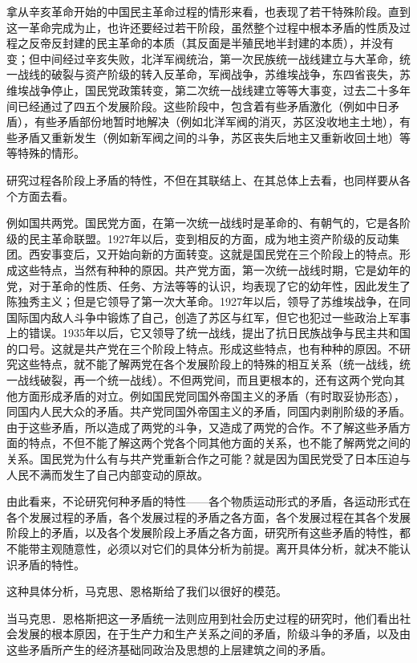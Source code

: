 \documentclass[UTF8, 12pt, a4paper]{ctexrep}
\begin{document}
拿从辛亥革命开始的中国民主革命过程的情形来看，也表现了若干特殊阶段。直到这一革命完成为止，也许还要经过若干阶段，虽然整个过程中根本矛盾的性质及过程之反帝反封建的民主革命的本质（其反面是半殖民地半封建的本质），并没有变；但中间经过辛亥失败，北洋军阀统治，第一次民族统一战线建立与大革命，统一战线的破裂与资产阶级的转入反革命，军阀战争，苏维埃战争，东四省丧失，苏维埃战争停止，国民党政策转变，第二次统一战线建立等等大事变，过去二十多年间已经通过了四五个发展阶段。这些阶段中，包含着有些矛盾激化（例如中日矛盾），有些矛盾部份地暂时地解决（例如北洋军阀的消灭，苏区没收地主土地），有些矛盾又重新发生（例如新军阀之间的斗争，苏区丧失后地主又重新收回土地）等等特殊的情形。

研究过程各阶段上矛盾的特性，不但在其联结上、在其总体上去看，也同样要从各个方面去看。

例如国共两党。国民党方面，在第一次统一战线时是革命的、有朝气的，它是各阶级的民主革命联盟。1927年以后，变到相反的方面，成为地主资产阶级的反动集团。西安事变后，又开始向新的方面转变。这就是国民党在三个阶段上的特点。形成这些特点，当然有种种的原因。共产党方面，第一次统一战线时期，它是幼年的党，对于革命的性质、任务、方法等等的认识，均表现了它的幼年性，因此发生了陈独秀主义；但是它领导了第一次大革命。1927年以后，领导了苏维埃战争，在同国际国内敌人斗争中锻炼了自己，创造了苏区与红军，但它也犯过一些政治上军事上的错误。1935年以后，它又领导了统一战线，提出了抗日民族战争与民主共和国的口号。这就是共产党在三个阶段上特点。形成这些特点，也有种种的原因。不研究这些特点，就不能了解两党在各个发展阶段上的特殊的相互关系（统一战线，统一战线破裂，再一个统一战线）。不但两党间，而且更根本的，还有这两个党向其他方面形成矛盾的对立。例如国民党同国外帝国主义的矛盾（有时取妥协形态），同国内人民大众的矛盾。共产党同国外帝国主义的矛盾，同国内剥削阶级的矛盾。由于这些矛盾，所以造成了两党的斗争，又造成了两党的合作。不了解这些矛盾方面的特点，不但不能了解这两个党各个同其他方面的关系，也不能了解两党之间的关系。国民党为什么有与共产党重新合作之可能？就是因为国民党受了日本压迫与人民不满而发生了自己内部变动的原故。

由此看来，不论研究何种矛盾的特性——各个物质运动形式的矛盾，各运动形式在各个发展过程的矛盾，各个发展过程的矛盾之各方面，各个发展过程在其各个发展阶段上的矛盾，以及各个发展阶段上矛盾之各方面，研究所有这些矛盾的特性，都不能带主观随意性，必须以对它们的具体分析为前提。离开具体分析，就决不能认识矛盾的特性。

这种具体分析，马克思、恩格斯给了我们以很好的模范。

当马克思．恩格斯把这一矛盾统一法则应用到社会历史过程的研究时，他们看出社会发展的根本原因，在于生产力和生产关系之间的矛盾，阶级斗争的矛盾，以及由这些矛盾所产生的经济基础同政治及思想的上层建筑之间的矛盾。
\end{document}
